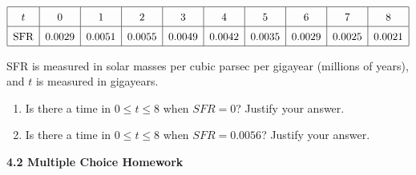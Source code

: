  \begin{align*}
    \arraycolsep=5.5pt\def\arraystretch{1.5}
    \begin{array}{|c|c|c|c|c|c|c|c|c|c|}
        \hline
        t & 0 & 1 & 2 & 3 & 4 & 5 & 6 & 7 & 8 \\ \hline
        \text{SFR} & 0.0029 & 0.0051 & 0.0055 & 0.0049 & 0.0042 & 0.0035 & 0.0029 & 0.0025 & 0.0021 \\
        \hline
    \end{array}
\end{align*}

SFR is measured in solar masses per cubic parsec per gigayear (millions of years), and $t$ is measured in gigayears. 
\begin{enumerate}[label=\hspace{11pt}(\alph*), align=left, leftmargin=*, labelsep=0.25em]
    \item Is there a time in $0 \leq t \leq 8$ when $SFR = 0$? Justify your answer.
    \item Is there a time in $0 \leq t \leq 8$ when $SFR = 0.0056$? Justify your answer.
\end{enumerate} \vspace{11pt}

\textbf{\large{4.2 Multiple Choice Homework}} \par

